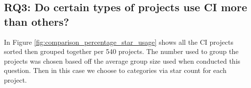 \documentclass[10pt,conference]{IEEEtran}
\begin{document}
\vspace*{-0.05in}
\subsection{\textbf{RQ3}: Do certain types of projects use CI more than others?}  
\label{section:RQ3}
\vspace*{-0.05in}

In Figure \ref{fig:comparison_percentage_star_usage} shows all the CI projects sorted then grouped together per 540 projects. The number used to group the projects was chosen based off the average group size used when \citet{Hilton2016} conducted this question. Then in this case we choose to categories via star count for each project. 
\end{document}
